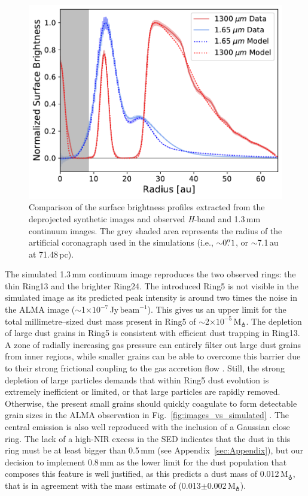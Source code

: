 \documentclass[fleqn,usenatbib,useAMS]{mnras}
\begin{document}
\begin{figure}
	\includegraphics[width=\columnwidth]{comp_fig_all_profiles_au.pdf}
    \caption{Comparison of the surface brightness profiles extracted from the deprojected synthetic images and observed \textit{H}-band and 1.3\,mm continuum images. The grey shaded area represents the radius of the artificial coronagraph used in the simulations (i.e., $\sim$0$\hbox{$.\!\!^{\prime\prime}$} 1$, or $\sim$7.1\,au at 71.48\,pc).}
    \label{fig:radprofiles}
\end{figure}

The simulated 1.3\,mm continuum image reproduces the two observed rings: the thin Ring13 and the brighter Ring24. The introduced Ring5 is not visible in the simulated image as its predicted peak intensity is around two times the noise in the ALMA image ($\sim$1$\times10^{-7}$\,Jy\,$\mathrm{beam}^{-1}$). This gives us an upper limit for the total millimetre--sized dust mass present in Ring5 of $\sim$2$\times10^{-5}$\,M$_{\earth}$. The depletion of large dust grains in Ring5 is consistent with efficient dust trapping in Ring13. A zone of radially increasing gas pressure can entirely filter out large dust grains from inner regions, while smaller grains can be able to overcome this barrier due to their strong frictional coupling to the gas accretion flow \citep[studied in the context of planetary gaps,][]{Rice2006,Zhu2012,Weber2018}. Still, the strong depletion of large particles demands that within Ring5 dust evolution is extremely inefficient or limited, or that large particles are rapidly removed. Otherwise, the present small grains should quickly coagulate to form detectable grain sizes in the ALMA observation in Fig.~\ref{fig:images_vs_simulated} \citep{Drazkowska2019}. The central emission is also well reproduced with the inclusion of a Gaussian close ring. The lack of a high-NIR excess in the SED indicates that the dust in this ring must be at least bigger than 0.5\,mm (see Appendix~\ref{sec:Appendix}), but our decision to implement 0.8\,mm as the lower limit for the dust population that composes this feature is well justified, as this predicts a dust mass of 0.012\,M$_{\earth}$, that is in agreement with the mass estimate of \citet{Francis_2020} (0.013$\pm$0.002\,M$_{\earth}$). 
\end{document}
